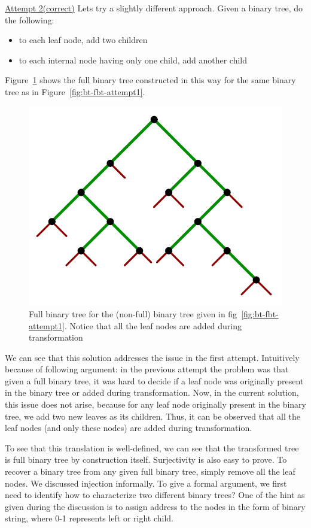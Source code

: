 \noindent\underline{Attempt 2(correct)}
Lets try a slightly different approach. Given a binary tree, do the following:
\begin{itemize}
    \item to each leaf node, add two children
    \item to each internal node having only one child, add another child
\end{itemize}
Figure~\ref{fig:binary-to-full-solution} shows the full binary tree constructed in this way for the same binary tree as in Figure~\ref{fig:bt-fbt-attempt1}.
\begin{figure}[h!]
    \centering
    \includegraphics[width=0.5\linewidth]{images/full-binary-3.png}
    \caption{Full binary tree for the (non-full) binary tree given in fig~\ref{fig:bt-fbt-attempt1}. Notice that all the leaf nodes are added during transformation}
    \label{fig:binary-to-full-solution}
\end{figure}
We can see that this solution addresses the issue in the first attempt. Intuitively because of following argument: in the previous attempt the problem was that given a full binary tree, it was hard to decide if a leaf node was originally present in the binary tree or added during transformation. Now, in the current solution, this issue does not arise, because for any leaf node originally present in the binary tree, we add two new leaves as its children. Thus, it can be observed that all the leaf nodes (and only these nodes) are added during transformation.

To see that this translation is well-defined, we can see that the transformed tree is full binary tree by construction itself. Surjectivity is also easy to prove. To recover a binary tree from any given full binary tree, simply remove all the leaf nodes. We discussed injection informally. To give a formal argument, we first need to identify how to characterize two different binary trees? One of the hint as given during the discussion is to assign address to the nodes in the form of binary string, where 0-1 represents left or right child. 

